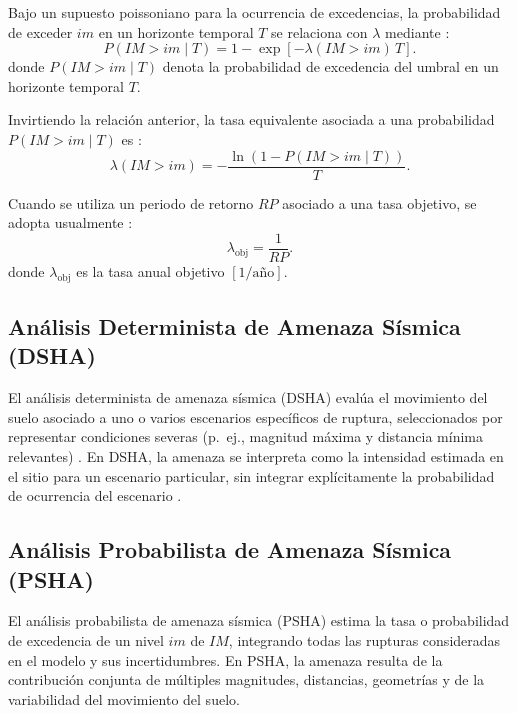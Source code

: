 Bajo un supuesto poissoniano para la ocurrencia de excedencias, la probabilidad de exceder \(im\) en un horizonte temporal \(T\) se relaciona con \(\lambda\) mediante \cite{Cornell1968}:
\begin{equation}
P(IM > im \mid T) = 1 - \exp\left[-\lambda(IM > im)\,T\right].
\label{eq:poe_from_lambda}
\end{equation}
donde \(P(IM>im\mid T)\) denota la probabilidad de excedencia del umbral en un horizonte temporal \(T\).

Invirtiendo la relación anterior, la tasa equivalente asociada a una probabilidad \(P(IM>im\mid T)\) es \cite{McGuire2004}:
\begin{equation}
\lambda(IM > im) = -\frac{\ln\left(1 - P(IM > im \mid T)\right)}{T}.
\label{eq:lambda_from_poe}
\end{equation}

Cuando se utiliza un periodo de retorno \(RP\) asociado a una tasa objetivo, se adopta usualmente \cite{BakerBradleyStafford2021}:
\begin{equation}
\lambda_{\text{obj}} = \frac{1}{RP}.
\label{eq:rp_to_lambda}
\end{equation}
donde \(\lambda_{\text{obj}}\) es la tasa anual objetivo \([\text{1/año}]\).

\subsection{Análisis Determinista de Amenaza Sísmica (DSHA)}

El análisis determinista de amenaza sísmica (DSHA) evalúa el movimiento del suelo asociado a uno o varios escenarios específicos de ruptura, seleccionados por representar condiciones severas (p.\ ej., magnitud máxima y distancia mínima relevantes) \cite{Bommer2002}. En DSHA, la amenaza se interpreta como la intensidad estimada en el sitio para un escenario particular, sin integrar explícitamente la probabilidad de ocurrencia del escenario \cite{Bommer2002}.

\subsection{Análisis Probabilista de Amenaza Sísmica (PSHA)}

El análisis probabilista de amenaza sísmica (PSHA) estima la tasa o probabilidad de excedencia de un nivel \(im\) de \(IM\), integrando todas las rupturas consideradas en el modelo y sus incertidumbres. En PSHA, la amenaza resulta de la contribución conjunta de múltiples magnitudes, distancias, geometrías y de la variabilidad del movimiento del suelo.

